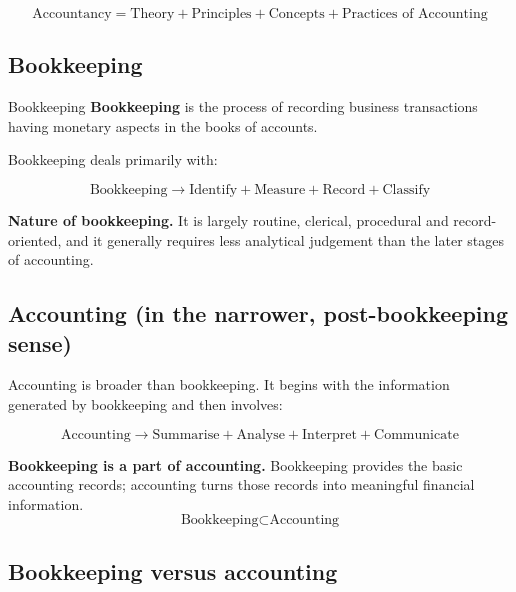 \documentclass[11pt,a4paper]{article}
\begin{document}
\[
\boxed{\text{Accountancy}=\text{Theory}+\text{Principles}+\text{Concepts}+\text{Practices of Accounting}}
\]

\subsection{Bookkeeping}

\begin{defbox}{Bookkeeping}
\textbf{Bookkeeping} is the process of recording business transactions having monetary aspects
in the books of accounts.
\end{defbox}

Bookkeeping deals primarily with:

\[
\boxed{\text{Bookkeeping}\rightarrow\text{Identify}+\text{Measure}+\text{Record}+\text{Classify}}
\]

\textbf{Nature of bookkeeping.} It is largely routine, clerical, procedural and record-oriented,
and it generally requires less analytical judgement than the later stages of accounting.

\subsection{Accounting (in the narrower, post-bookkeeping sense)}

Accounting is broader than bookkeeping. It begins with the information generated by
bookkeeping and then involves:

\[
\boxed{\text{Accounting}\rightarrow\text{Summarise}+\text{Analyse}+\text{Interpret}+\text{Communicate}}
\]

\begin{keybox}
\textbf{Bookkeeping is a part of accounting.} Bookkeeping provides the basic accounting
records; accounting turns those records into meaningful financial information.
\[
\boxed{\text{Bookkeeping}\subset\text{Accounting}}
\]
\end{keybox}

\subsection{Bookkeeping versus accounting}
\end{document}
